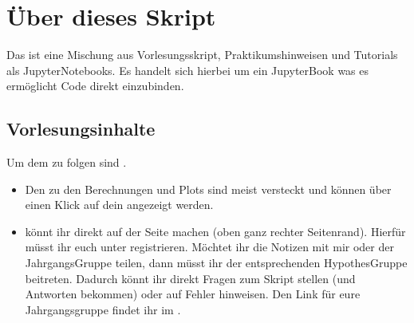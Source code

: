 \documentclass[letterpaper,10pt,english]{jupyterBook}
\begin{document}
\chapter{Über dieses Skript}
\label{\detokenize{content/00_jupyter:uber-dieses-skript}}\label{\detokenize{content/00_jupyter::doc}}
\sphinxAtStartPar
Das  ist eine Mischung aus Vorlesungsskript, Praktikumshinweisen und Tutorials als Jupyter\sphinxhyphen{}Notebooks. Es handelt sich hierbei um ein Jupyter\sphinxhyphen{}Book was es ermöglicht \sphinxhyphen{}Code direkt einzubinden.


\section{Vorlesungsinhalte}
\label{\detokenize{content/00_jupyter:vorlesungsinhalte}}
\sphinxAtStartPar
Um dem  zu folgen sind .
\begin{itemize}
\item {} 
\sphinxAtStartPar
Den  zu den Berechnungen und Plots sind meist versteckt und können über einen Klick auf dein  angezeigt werden.

\item {} 
\sphinxAtStartPar
{} könnt ihr direkt auf der Seite machen (oben ganz rechter Seitenrand). Hierfür müsst ihr euch unter  registrieren. Möchtet ihr die Notizen mit mir oder der Jahrgangs\sphinxhyphen{}Gruppe teilen, dann müsst ihr der entsprechenden Hypothes\sphinxhyphen{}Gruppe beitreten. Dadurch könnt ihr direkt Fragen zum Skript stellen (und Antworten bekommen) oder auf Fehler hinweisen. Den Link für eure Jahrgangsgruppe findet ihr im .

\end{itemize}
\end{document}
